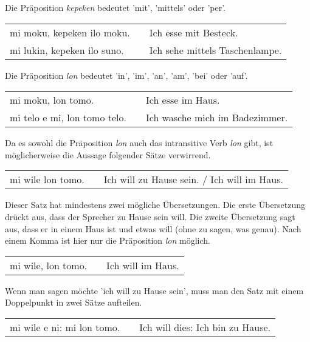 %
Die Präposition \textit{kepeken} bedeutet 'mit', 'mittels' oder 'per'.

\begin{supertabular}{p{5,5cm}|ll}
mi moku, kepeken ilo moku. && Ich esse mit Besteck. \\
mi lukin, kepeken ilo suno. && Ich sehe mittels Taschenlampe.  \\
\end{supertabular} 

%
%
Die Präposition \textit{lon} bedeutet 'in', 'im', 'an', 'am', 'bei' oder 'auf'.

\begin{supertabular}{p{5,5cm}|ll}
mi moku, lon tomo. && Ich esse im Haus. \\
mi telo e mi, lon tomo telo. && Ich wasche mich im Badezimmer. \\
\end{supertabular} 

Da es sowohl die Präposition \textit{lon} auch das intransitive Verb \textit{lon} gibt, ist möglicherweise die Aussage folgender Sätze verwirrend.

\begin{supertabular}{p{5,5cm}|ll}
mi wile lon tomo. && Ich will zu Hause sein. / Ich will im Haus. \\
\end{supertabular} 

Dieser Satz hat mindestens zwei mögliche Übersetzungen. 
Die erste Übersetzung drückt aus, dass der Sprecher zu Hause sein will. 
Die zweite Übersetzung sagt aus, dass er in einem Haus ist und etwas will (ohne zu sagen, was genau). 
Nach einem Komma ist hier nur die Präposition \textit{lon} möglich.

\begin{supertabular}{p{5,5cm}|ll}
mi wile, lon tomo. && Ich will im Haus.  \\
\end{supertabular}

Wenn man sagen möchte 'ich will zu Hause sein', muss man den Satz mit einem Doppelpunkt in zwei Sätze aufteilen.

\begin{supertabular}{p{5,5cm}|ll}
mi wile e ni: mi lon tomo. && Ich will dies: Ich bin zu Hause. \\
\end{supertabular} 

